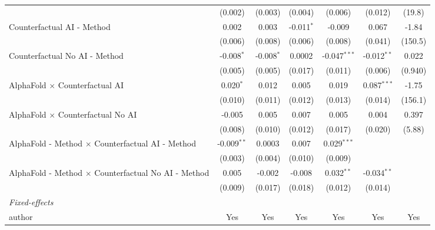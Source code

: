 \begin{tabular}{lcccccc}
                                                              & (0.002)       & (0.003)      & (0.004)      & (0.006)        & (0.012)       & (19.8)\\   
   Counterfactual AI - Method                                 & 0.002         & 0.003        & -0.011$^{*}$ & -0.009         & 0.067         & -1.84\\   
                                                              & (0.006)       & (0.008)      & (0.006)      & (0.008)        & (0.041)       & (150.5)\\   
   Counterfactual No AI - Method                              & -0.008$^{*}$  & -0.008$^{*}$ & 0.0002       & -0.047$^{***}$ & -0.012$^{**}$ & 0.022\\   
                                                              & (0.005)       & (0.005)      & (0.017)      & (0.011)        & (0.006)       & (0.940)\\   
   AlphaFold $\times$ Counterfactual AI                       & 0.020$^{*}$   & 0.012        & 0.005        & 0.019          & 0.087$^{***}$ & -1.75\\   
                                                              & (0.010)       & (0.011)      & (0.012)      & (0.013)        & (0.014)       & (156.1)\\   
   AlphaFold $\times$ Counterfactual No AI                    & -0.005        & 0.005        & 0.007        & 0.005          & 0.004         & 0.397\\   
                                                              & (0.008)       & (0.010)      & (0.012)      & (0.017)        & (0.020)       & (5.88)\\   
   AlphaFold - Method $\times$ Counterfactual AI - Method     & -0.009$^{**}$ & 0.0003       & 0.007        & 0.029$^{***}$  &               &   \\   
                                                              & (0.003)       & (0.004)      & (0.010)      & (0.009)        &               &   \\   
   AlphaFold - Method $\times$ Counterfactual No AI - Method  & 0.005         & -0.002       & -0.008       & 0.032$^{**}$   & -0.034$^{**}$ &   \\   
                                                              & (0.009)       & (0.017)      & (0.018)      & (0.012)        & (0.014)       &   \\   
   \midrule
   \emph{Fixed-effects}\\
   author                                                     & Yes           & Yes          & Yes          & Yes            & Yes           & Yes\\  

\end{tabular}
